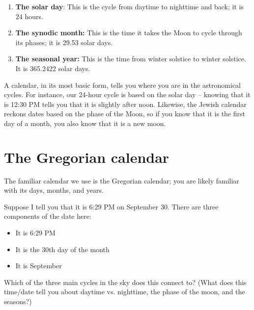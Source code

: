 \documentclass[11pt]{article}
\begin{document}
\begin{enumerate}
	\item {\bf The solar day}: This is the cycle from daytime to nighttime and back; it is 24 hours.
	\item {\bf The synodic month:} This is the time it takes the Moon to cycle through its phases; it is 29.53 solar days.
	\item {\bf The seasonal year:} This is the time from winter solstice to winter solstice. It is 365.2422 solar days.
\end{enumerate}


A calendar, in its most basic form, tells you where you are in the astronomical cycles. For instance, our 24-hour cycle is based on the solar day -- knowing that it is 12:30 PM tells you that it is slightly after noon. Likewise, the Jewish calendar reckons dates based on the phase of the Moon, so if you know that it is the first day of a month, you also know that it is a new moon. 

\section{The Gregorian calendar}

The familiar calendar we use is the Gregorian calendar; you are likely familiar with its days, months, and years.

Suppose I tell you that it is 6:29 PM on September 30.  There are three components of the date here: 

\begin{itemize}
	\item It is 6:29 PM
	\item It is the 30th day of the month
	\item It is September
\end{itemize}

Which of the three main cycles in the sky does this connect to? (What does this time/date tell you about daytime vs. nighttime, the phase of the moon, and the seasons?) 
\end{document}
